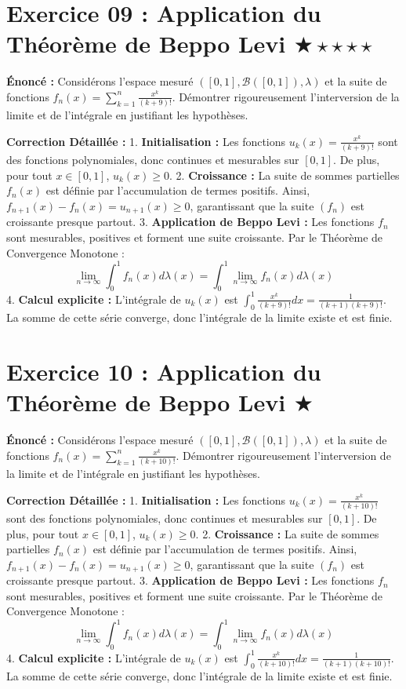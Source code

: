 \documentclass[11pt,a4paper]{article}
\begin{document}
\vspace{1cm}

\section*{Exercice 09 : Application du Théorème de Beppo Levi \quad $\bigstar\star\star\star\star$}

\textbf{Énoncé :}
Considérons l'espace mesuré $([0, 1], \mathcal{B}([0, 1]), \lambda)$ et la suite de fonctions $f_n(x) = \sum_{k=1}^n \frac{x^k}{(k+9)!}$.
Démontrer rigoureusement l'interversion de la limite et de l'intégrale en justifiant les hypothèses.

\textbf{Correction Détaillée :}
1. \textbf{Initialisation :}
   Les fonctions $u_k(x) = \frac{x^k}{(k+9)!}$ sont des fonctions polynomiales, donc continues et mesurables sur $[0, 1]$. De plus, pour tout $x \in [0, 1]$, $u_k(x) \ge 0$.
2. \textbf{Croissance :}
   La suite de sommes partielles $f_n(x)$ est définie par l'accumulation de termes positifs. Ainsi, $f_{n+1}(x) - f_n(x) = u_{n+1}(x) \ge 0$, garantissant que la suite $(f_n)$ est croissante presque partout.
3. \textbf{Application de Beppo Levi :}
   Les fonctions $f_n$ sont mesurables, positives et forment une suite croissante. Par le Théorème de Convergence Monotone :
   $$\lim_{n \to \infty} \int_0^1 f_n(x) d\lambda(x) = \int_0^1 \lim_{n \to \infty} f_n(x) d\lambda(x)$$
4. \textbf{Calcul explicite :}
   L'intégrale de $u_k(x)$ est $\int_0^1 \frac{x^k}{(k+9)!} dx = \frac{1}{(k+1)(k+9)!}$.
   La somme de cette série converge, donc l'intégrale de la limite existe et est finie.

\vspace{1cm}

\section*{Exercice 10 : Application du Théorème de Beppo Levi \quad $\bigstar$}

\textbf{Énoncé :}
Considérons l'espace mesuré $([0, 1], \mathcal{B}([0, 1]), \lambda)$ et la suite de fonctions $f_n(x) = \sum_{k=1}^n \frac{x^k}{(k+10)!}$.
Démontrer rigoureusement l'interversion de la limite et de l'intégrale en justifiant les hypothèses.

\textbf{Correction Détaillée :}
1. \textbf{Initialisation :}
   Les fonctions $u_k(x) = \frac{x^k}{(k+10)!}$ sont des fonctions polynomiales, donc continues et mesurables sur $[0, 1]$. De plus, pour tout $x \in [0, 1]$, $u_k(x) \ge 0$.
2. \textbf{Croissance :}
   La suite de sommes partielles $f_n(x)$ est définie par l'accumulation de termes positifs. Ainsi, $f_{n+1}(x) - f_n(x) = u_{n+1}(x) \ge 0$, garantissant que la suite $(f_n)$ est croissante presque partout.
3. \textbf{Application de Beppo Levi :}
   Les fonctions $f_n$ sont mesurables, positives et forment une suite croissante. Par le Théorème de Convergence Monotone :
   $$\lim_{n \to \infty} \int_0^1 f_n(x) d\lambda(x) = \int_0^1 \lim_{n \to \infty} f_n(x) d\lambda(x)$$
4. \textbf{Calcul explicite :}
   L'intégrale de $u_k(x)$ est $\int_0^1 \frac{x^k}{(k+10)!} dx = \frac{1}{(k+1)(k+10)!}$.
   La somme de cette série converge, donc l'intégrale de la limite existe et est finie.
\end{document}
